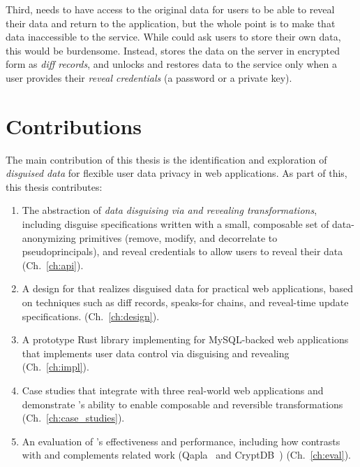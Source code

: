 %
Third, \sys needs to have access to the original data for users to be able to
reveal their data and return to the application, but the whole point is to make
that data inaccessible to the service.
%
While \sys could ask users to store their own \xxed data, this would be
burdensome.
%
Instead, \sys stores the \xxed data on the server in encrypted form as
\emph{diff records}, and unlocks
and restores data to the service only when a user provides their \emph{reveal
credentials} (\eg a password or a private key).

%
\section{Contributions}
%
The main contribution of this thesis is the identification and exploration of
\emph{disguised data} for flexible user data privacy in web applications. As
part of this, this thesis contributes:

\begin{enumerate}[nosep]
    \item The abstraction of \emph{data disguising via \xxing and revealing
        transformations}, including 
        disguise specifications written with a small, composable set of
        data-anonymizing primitives (remove, modify, and decorrelate to
        pseudoprincipals), and reveal credentials to allow users
        to reveal their data (Ch.~\ref{ch:api}).

    \item A design for \sys that realizes disguised data for practical web
        applications, based on techniques such as diff records, speaks-for
        chains, and reveal-time update specifications.
        (Ch.~\ref{ch:design}).

    \item A prototype Rust library implementing \sys for MySQL-backed web applications that
        implements user data control via disguising and revealing
        (Ch.~\ref{ch:impl}).

    \item Case studies that integrate \sys with three real-world web
    applications and demonstrate \sys's ability to enable composable and
        reversible transformations (Ch.~\ref{ch:case_studies}).

    \item An evaluation of \sys's effectiveness and performance, including how
    \sys contrasts with and complements related work (Qapla~\cite{qapla} and
        CryptDB~\cite{cryptdb}) (Ch.~\ref{ch:eval}).
\end{enumerate}
%

